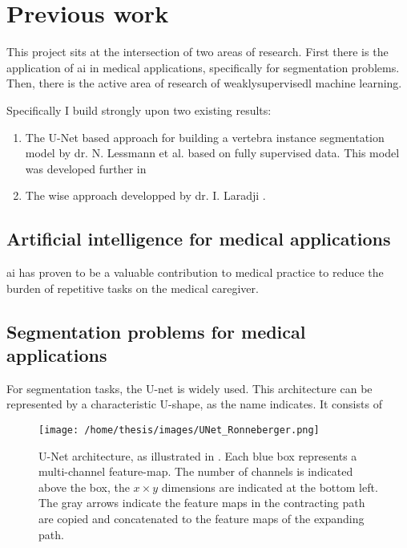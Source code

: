 \chapter{Previous work}

This project sits at the intersection of two areas of research. 
First there is the application of \Gls{ai} in medical applications, specifically for segmentation problems.
Then, there is the active area of research of \Gls{weaklysupervisedl} machine learning.

Specifically I build strongly upon two existing results:

\begin{enumerate}
    \item The U-Net based approach for building a vertebra instance segmentation model by dr. N. Lessmann et al. \cite{Lessmann2018} based on fully supervised data. This model was developed further in \cite{Chuang2019}
    \item The \acrfull{wise} approach developped by dr. I. Laradji \cite{Laradji2020,Laradji2018}. 
\end{enumerate}

\section{Artificial intelligence for medical applications}


\Gls{ai} has proven to be a valuable contribution to medical practice to reduce the burden of repetitive tasks on the medical caregiver.


\section{Segmentation problems for medical applications}


For segmentation tasks, the U-net \cite{Ronneberger2015} is widely used. 
This architecture can be represented by a characteristic U-shape, as the name indicates.
It consists of 

\begin{SCfigure}[][htb]
    \texttt{[image: /home/thesis/images/UNet\_Ronneberger.png]}
    \caption{U-Net architecture, as illustrated in \cite{Ronneberger2015}. 
    Each blue box represents a multi-channel feature-map. 
    The number of channels is indicated above the box, the $x \times y$ dimensions are indicated at the bottom left.
    The gray arrows indicate the feature maps in the contracting path are copied and concatenated to the feature maps of the expanding path.}
    \label{fig:unet}
\end{SCfigure}

